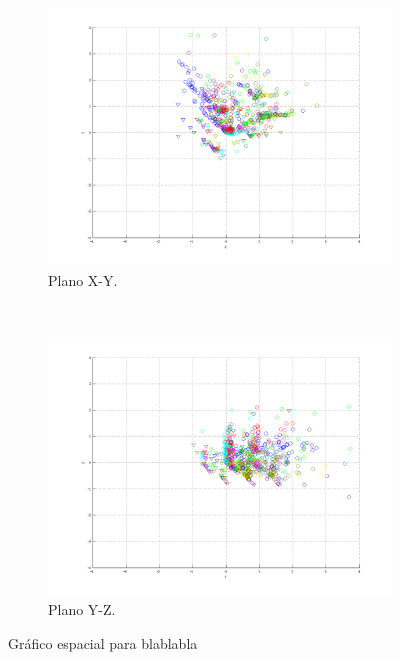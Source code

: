 \documentclass[informe.tex]{subfiles}
\begin{document}
\begin{figure}[H]
        \begin{subfigure}[b]{0.49\textwidth}
                \includegraphics[width=\textwidth]{graficos/fold1_criterioParadao_reglaM_alpha0_rep1_2XY.png}
                \caption{Plano X-Y.}
        \end{subfigure}
        ~ %
        \begin{subfigure}[b]{0.49\textwidth}
                \includegraphics[width=\textwidth]{graficos/fold1_criterioParadao_reglaM_alpha0_rep1_3YZ.png}
                \caption{Plano Y-Z.}
        \end{subfigure}
        \caption{Gráfico espacial para blablabla}
        \label{fig:blablabla}
	\end{figure}
      
\end{document}
